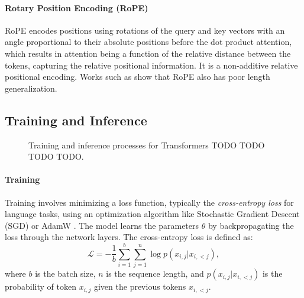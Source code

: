 \paragraph{Rotary Position Encoding (RoPE)}\label{subsec:rope}
RoPE \cite{su_roformer_2024} encodes positions using rotations of the query and key vectors with an angle proportional to their absolute positions before the dot product attention, which results in attention being a function of the relative distance between the tokens, capturing the relative positional information. It is a non-additive relative positional encoding. Works such as \cite{press_train_2021,kazemnejad_impact_2023} show that RoPE also has poor length generalization.

\subsection{Training and Inference}\label{subsec:training_inference}



\begin{figure}[h!]
    \centering


    \caption{Training and inference processes for Transformers TODO TODO TODO TODO.}
    \label{fig:transformer_training_inference}
\end{figure}

\paragraph{Training}

Training involves minimizing a loss function, typically the \emph{cross-entropy loss} for language tasks, using an optimization algorithm like Stochastic Gradient Descent (SGD) or AdamW \parencite{loshchilov_decoupled_2018}. The model learns the parameters $\theta$ by backpropagating the loss through the network layers. The cross-entropy loss is defined as:
\begin{equation*}
    \mathcal{L} = -\frac{1}{b} \sum_{i=1}^{b} \sum_{j=1}^{n} \log p(x_{i,j} | x_{i,<j}),
\end{equation*}
where $b$ is the batch size, $n$ is the sequence length, and $p(x_{i,j} | x_{i,<j})$ is the probability of token $x_{i,j}$ given the previous tokens $x_{i,<j}$.

